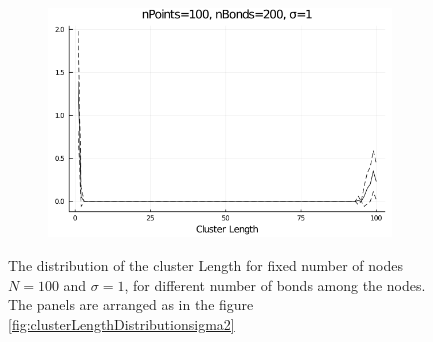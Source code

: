\begin{figure}
\begin{subfigure}{0.32\textwidth}
		\includegraphics[width=\textwidth]{figures/ClusterLengthDistributionWithNBonds/sigma1/clusterLengthDistribution_nPoints100 nBonds200 sigma1.png}
	\end{subfigure}
	\caption{The distribution of the cluster Length for fixed number of nodes $N=100$ and  $\sigma=1$, for different number of bonds among the nodes. The panels are arranged as in the figure \ref{fig:clusterLengthDistributionsigma2}}
	\label{fig:clusterLengthDistributionsigma1}
\end{figure}

